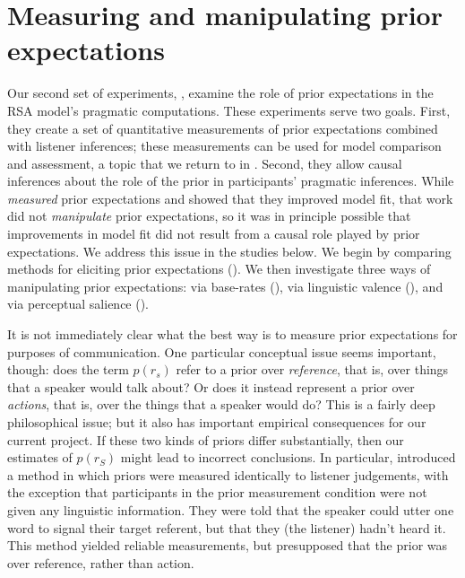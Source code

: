 \section{Measuring and manipulating prior expectations}

Our second set of experiments, , examine the role of prior expectations in the RSA model's pragmatic computations. These experiments serve two goals. First, they create a set of quantitative measurements of prior expectations combined with listener inferences; these measurements can be used for model comparison and assessment, a topic that we return to in . Second, they allow causal inferences about the role of the prior in participants' pragmatic inferences. While  \emph{measured} prior expectations and showed that they improved model fit, that work did not \emph{manipulate} prior expectations, so it was in principle possible that improvements in model fit did not result from a causal role played by prior expectations. We address this issue in the studies below. We begin by comparing methods for eliciting prior expectations (). We then investigate three ways of manipulating prior expectations: via base-rates (), via linguistic valence (), and via perceptual salience (). 

It is not immediately clear what the best way is to measure prior expectations for purposes of communication. One particular conceptual issue seems important, though: does the term $p(r_s)$ refer to a prior over \emph{reference}, that is, over things that a speaker would talk about? Or does it instead represent a prior over \emph{actions}, that is, over the things that a speaker would do? This is a fairly deep philosophical issue; but it also has important empirical consequences for our current project. If these two kinds of priors differ substantially, then our estimates of $p(r_S)$ might lead to incorrect conclusions. In particular,  introduced a method in which priors were measured identically to listener judgements, with the exception that participants in the prior measurement condition were not given any linguistic information. They were told that the speaker could utter one word to signal their target referent, but that they (the listener) hadn't heard it. This method yielded reliable measurements, but presupposed that the prior was over reference, rather than action. 


